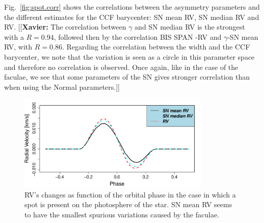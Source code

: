 \documentclass{aa}
\newcommand{\xavier}[1]{{\color{blue}[[\textbf{Xavier: }#1]]}}
\begin{document}
Fig.~\ref{fig:spot.corr} shows the correlations between the asymmetry parameters and the different estimates for the CCF barycenter: SN mean RV, SN median RV and RV. \xavier{The correlation between $\gamma$ and SN median RV is the strongest with a $R=0.94$, followed then by the correlation BIS SPAN -RV and $\gamma$-SN mean RV, with $R=0.86$. Regarding the correlation between the width and the CCF barycenter, we note that the variation is seen as a circle in this parameter space and therefore no correlation is observed. Once again, like in the case of the faculae, we see that some parameters of the SN gives stronger correlation than when using the Normal parameters.}

\begin{figure}[htbp]
   \centering
\includegraphics[width=3.6in]{RV_comparison_SPOT.pdf} 
\caption{RV's changes as function of the orbital phase in the case in which a spot is present on the photosphere of the star. SN mean RV seems to have the smallest spurious variations caused by the faculae.}
    \label{fig:spot}
\end{figure}
\end{document}
